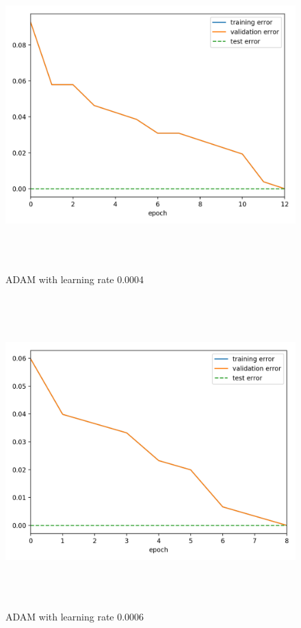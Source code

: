 \documentclass[a4paper]{article}
\begin{document}
\begin{figure}[h]
\caption{ADAM with learning rate 0.0004}
\centering
\includegraphics[width=15cm, height=12cm]{AD_LR0004}
\end{figure}

\begin{figure}[h]
\caption{ADAM with learning rate 0.0006}
\centering
\includegraphics[width=15cm, height=12cm]{AD_LR0006}
\end{figure}
\end{document}
